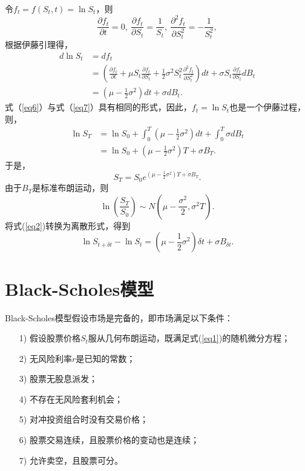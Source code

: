 令$f_t = f(S_t,t) = \ln S_t$，则
$$\frac{\partial f_t}{\partial t} = 0,\ \frac{\partial f_t}{\partial S_t} =\frac{1}{S_t},\ 
\frac{\partial^2 f_t}{\partial S_t^2} =-\frac{1}{S_t^2},$$
根据伊藤引理得，
\begin{align}
	\label{eq6}
	d\ln S_t & = df_t  \nonumber \\
	& =  \left(\frac{\partial f_t}{\partial t}+\mu S_t \frac{\partial f_t}{\partial S_t}+
	\frac{1}{2}\sigma^2 S_t^2 \frac{\partial^2 f_t}{\partial S_t^2} \right)dt +\sigma S_t \frac{\partial f_t}{\partial S_t}dB_t \nonumber \\
	& = \left(\mu - \frac{1}{2}\sigma^2 \right)dt+\sigma dB_t .
\end{align}
式（\ref{eq6}）与式（\ref{eq7}）具有相同的形式，因此，$f_t = \ln S_t$也是一个伊藤过程，则，
\begin{align}
	\label{eq2}
	\ln S_T 
	& = \ln S_0 + \int_{0}^{T}(\mu - \frac{1}{2}\sigma^2)dt + \int_{0}^{T}\sigma dB_t \nonumber \\
	& = \ln S_0 + (\mu-\frac{1}{2}\sigma^2)T + \sigma B_T .
\end{align}
于是，$$S_T = S_0 e^{(\mu-\frac{1}{2}\sigma^2)T + \sigma B_T }.$$
由于$B_T$是标准布朗运动，则
\begin{equation}
	\label{eqJHBM}
	\ln\left(\frac{S_T}{S_0}\right) \sim N\left(\mu-\frac{\sigma^2}{2},\sigma^2T\right).
\end{equation}
将式(\ref{eq2})转换为离散形式，得到
$$\ln S_{t+\delta t}-\ln S_t = \left( \mu - \frac{1}{2}\sigma^2\right)\delta t + \sigma B_{\delta t } .$$

\section{Black-Scholes模型}
Black-Scholes模型假设市场是完备的，即市场满足以下条件：
\begin{enumerate}[itemindent=2em,fullwidth]
	\item[1)] 假设股票价格$S_t$服从几何布朗运动，既满足式(\ref{eq1})的随机微分方程；
	\item[2)] 无风险利率$r$是已知的常数；
	\item[3)] 股票无股息派发；
	\item[4)] 不存在无风险套利机会；
	\item[5)] 对冲投资组合时没有交易价格；
	\item[6)] 股票交易连续，且股票价格的变动也是连续；
	\item[7)] 允许卖空，且股票可分。
\end{enumerate}


